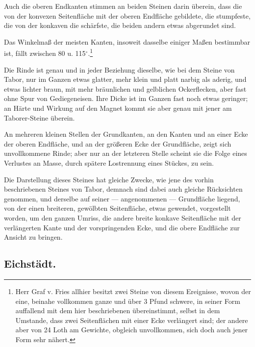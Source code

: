 \documentclass[a4paper, 11pt, oneside, german]{article}
\begin{document}
Auch die oberen Endkanten stimmen an beiden Steinen darin überein, dass die von der konvexen Seitenfläche mit der oberen Endfläche gebildete, die stumpfeste, die von der konkaven die schärfste, die beiden andern etwas abgerundet sind.

Das Winkelmaß der meisten Kanten, insoweit dasselbe einiger Maßen bestimmbar ist, fällt zwischen 80 u. 115$^{\circ}$.\footnote{Herr Graf v. Fries allhier besitzt zwei Steine von diesem Ereignisse, wovon der eine, beinahe vollkommen ganze und über 3 Pfund schwere, in seiner Form auffallend mit dem hier beschriebenen übereinstimmt, selbst in dem Umstande, dass zwei Seitenflächen mit einer Ecke verlängert sind; der andere aber von 24 Loth am Gewichte, obgleich unvollkommen, sich doch auch jener Form sehr nähert.}

Die Rinde ist genau und in jeder Beziehung dieselbe, wie bei dem Steine von Tabor, nur im Ganzen etwas glatter, mehr klein und platt narbig als aderig, und etwas lichter braun, mit mehr bräunlichen und gelblichen Ockerflecken, aber fast ohne Spur von Gediegeneisen. Ihre Dicke ist im Ganzen fast noch etwas geringer; an Härte und Wirkung auf den Magnet kommt sie aber genau mit jener am Taborer-Steine überein.

An mehreren kleinen Stellen der Grundkanten, an den Kanten und an einer Ecke der oberen Endfläche, und an der größeren Ecke der Grundfläche, zeigt sich unvollkommene Rinde; aber nur an der letzteren Stelle scheint sie die Folge eines Verlustes an Masse, durch spätere Lostrennung eines Stückes, zu sein.

Die Darstellung dieses Steines hat gleiche Zwecke, wie jene des vorhin beschriebenen Steines von Tabor, demnach sind dabei auch gleiche Rücksichten genommen, und derselbe auf seiner --- angenommenen --- Grundfläche liegend, von der einen breiteren, gewölbten Seitenfläche, etwas gewendet, vorgestellt worden, um den ganzen Umriss, die andere breite konkave Seitenfläche mit der verlängerten Kante und der vorspringenden Ecke, und die obere Endfläche zur Ansicht zu bringen.

\subsection{Eichstädt.}
\end{document}
